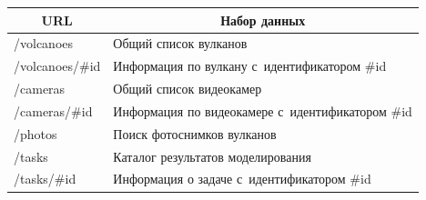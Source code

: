 \begin{table}[b]\small %


\vspace*{-12pt}


\begin{center}




\vspace*{2ex}





\begin{tabular}{|l|l|}


\hline


\multicolumn{1}{|c|}{URL}&\multicolumn{1}{c|}{Набор данных}\\


\hline


/volcanoes&Общий список вулканов\\


/volcanoes/\#id&Информация по вулкану с~идентификатором \#id\\


/cameras&Общий список видеокамер\\


/cameras/\#id&Информация по видеокамере с~идентификатором \#id\\


/photos&Поиск фотоснимков вулканов\\


/tasks&Каталог результатов моделирования\\


/tasks/\#id&Информация о задаче с~идентификатором \#id\\


\hline


\end{tabular}


\end{center}






\begin{center}




\vspace*{2ex}






\end{center}
\end{table}
